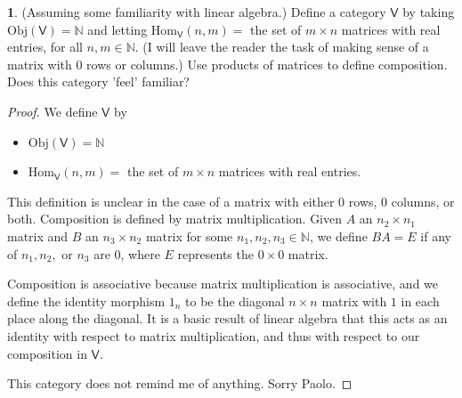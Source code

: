 \documentclass{article}
\newcounter{section-number}
\theoremstyle{definition}
\newtheorem{ex}{}[section-number]
\begin{document}
\begin{ex}
	(Assuming some familiarity with linear algebra.)
	Define a category $\mathsf{V}$ by taking $\mathrm{Obj}(\mathsf{V}) = \mathbb{N}$ and letting $\mathrm{Hom}_{\mathsf{V}}(n, m) =$ the set of $m \times n$ matrices with real entries, for all $n, m \in \mathbb{N}$.
	(I will leave the reader the task of making sense of a matrix with 0 rows or columns.)
	Use products of matrices to define composition.
	Does this category 'feel' familiar?
\end{ex}
\begin{proof}
	We define $\mathsf{V}$ by \begin{itemize}
		\item $\mathrm{Obj}(\mathsf{V}) = \mathbb{N}$
		\item $\mathrm{Hom}_{\mathsf{V}}(n, m) =$ the set of $m \times n$ matrices with real entries.
	\end{itemize}
	This definition is unclear in the case of a matrix with either 0 rows, 0 columns, or both.
	Composition is defined by matrix multiplication.
	Given $A$ an $n_2 \times n_1$ matrix and $B$ an $n_3 \times n_2$ matrix for some $n_1, n_2, n_3 \in \mathbb{N}$, we define $BA = E$ if any of $n_1, n_2,$ or $n_3$ are 0, where $E$ represents the $0 \times 0$ matrix.

	Composition is associative because matrix multiplication is associative, and we define the identity morphism $1_n$ to be the diagonal $n \times n$ matrix with $1$ in each place along the diagonal.
	It is a basic result of linear algebra that this acts as an identity with respect to matrix multiplication, and thus with respect to our composition in $\mathsf{V}$.

	This category does not remind me of anything.
	Sorry Paolo.
\end{proof}
\end{document}
